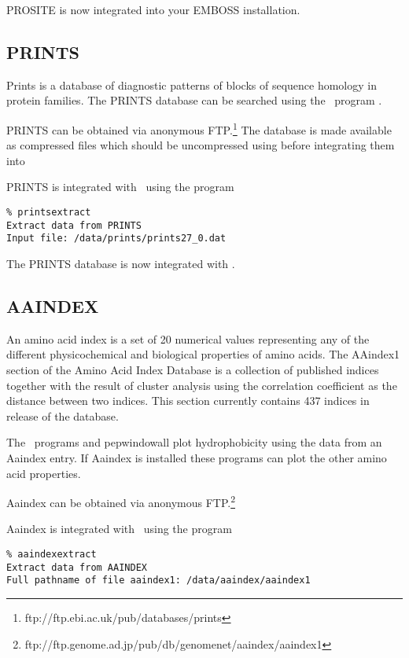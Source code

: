 \documentclass{report}
\begin{document}
PROSITE is now integrated into your EMBOSS installation.

\subsection{PRINTS}

Prints is a database of diagnostic patterns of blocks of sequence
homology in protein families. The PRINTS database can be searched
using the \EMBOSS\ program .

PRINTS can be obtained via anonymous
FTP.\footnote{ftp://ftp.ebi.ac.uk/pub/databases/prints} The database
is made available as compressed files which should be uncompressed
using  before integrating them into \EMBOSS\

PRINTS is integrated with \EMBOSS\ using the program 

\begin{verbatim}
% printsextract
Extract data from PRINTS
Input file: /data/prints/prints27_0.dat
\end{verbatim}

The PRINTS database is now integrated with \EMBOSS.

\subsection{AAINDEX}

An amino acid index is a set of 20 numerical values representing any
of the different physicochemical and biological properties of amino
acids.  The AAindex1 section of the Amino Acid Index Database is a
collection of published indices together with the result of cluster
analysis using the correlation coefficient as the distance between two
indices.  This section currently contains 437 indices in release
 of the database.

The \EMBOSS\ programs  and {pepwindowall} plot
hydrophobicity using the data from an Aaindex entry. If Aaindex is
installed these programs can plot the other amino acid properties.

Aaindex can be obtained via anonymous
FTP.\footnote{ftp://ftp.genome.ad.jp/pub/db/genomenet/aaindex/aaindex1}

Aaindex is integrated with \EMBOSS\ using the program 

\begin{verbatim}
% aaindexextract
Extract data from AAINDEX
Full pathname of file aaindex1: /data/aaindex/aaindex1
\end{verbatim}
\end{document}
